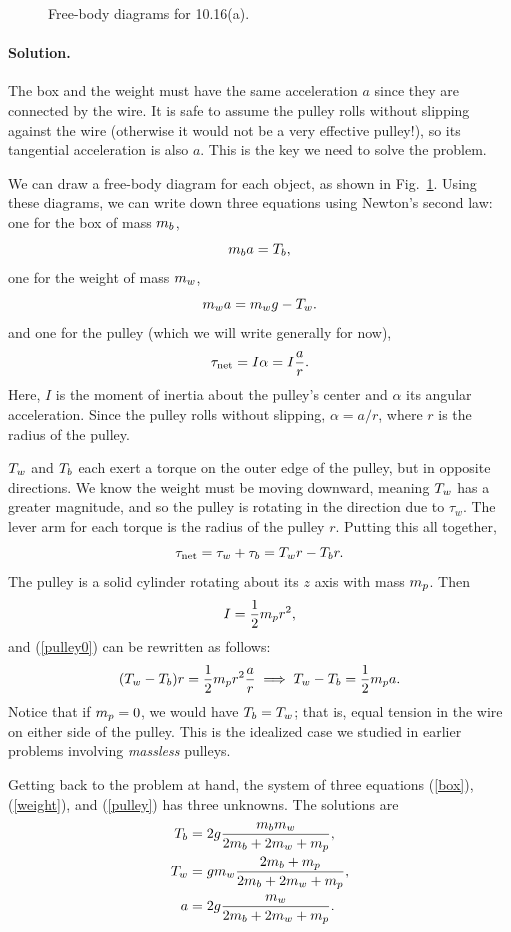 \documentclass[11pt]{article}
\newcommand{\refeq}[1]{(\ref{#1})}
\newcommand{\beq}{\begin{equation*}}
\newcommand{\eeq}{\end{equation*}}
\newcommand{\beqn}{\begin{equation}}
\newcommand{\eeqn}{\end{equation}}
\newenvironment{solution}
{
    \paragraph{Solution.}
    \ignorespaces
}
{
    \bigskip
}
\begin{document}
\begin{figure}[b]
	\vspace{1.5in}
	\caption{Free-body diagrams for 10.16(a).}
	\label{E10.16a}
\end{figure}

\begin{solution}
	The box and the weight must have the same acceleration $a$ since they are connected by the wire.  It is safe to assume the pulley rolls without slipping against the wire (otherwise it would not be a very effective pulley!), so its tangential acceleration is also $a$.  This is the key we need to solve the problem.
	
	We can draw a free-body diagram for each object, as shown in Fig.~\ref{E10.16a}.  Using these diagrams, we can write down three equations using Newton's second law: one for the box of mass $m_b$,
	\beqn \label{box}
		\mb a = \Tb,
	\eeqn
	one for the weight of mass $m_w$,
	\beqn \label{weight}
		\mw a = \mw g - \Tw.
	\eeqn
	and one for the pulley (which we will write generally for now),
	\beqn \label{pulley0}
		\tnet = I \alpha = I \frac{a}{r}.
	\eeqn
	Here, $I$ is the moment of inertia about the pulley's center and $\alpha$ its angular acceleration.  Since the pulley rolls without slipping, $\alpha = a / r$, where $r$ is the radius of the pulley.
			
	$T_w$ and $T_b$ each exert a torque on the outer edge of the pulley, but in opposite directions.  We know the weight must be moving downward, meaning $T_w$ has a greater magnitude, and so the pulley is rotating in the direction due to $\tau_w$.  The lever arm for each torque is the radius of the pulley $r$.  Putting this all together,
	\beq
		\tnet = \tau_w + \tau_b = \Tw r - \Tb r.
	\eeq
	The pulley is a solid cylinder rotating about its $z$ axis with mass $m_p$.  Then
	\beq
		I = \frac{1}{2} \mmp r^2,
	\eeq
	and \refeq{pulley0} can be rewritten as follows:
	\beqn \label{pulley}
		(\Tw - \Tb) r = \frac{1}{2} \mmp r^2 \frac{a}{r} \implies \Tw - \Tb = \frac{1}{2} \mmp a.
	\eeqn
	Notice that if $m_p = 0$, we would have $T_b = T_w$; that is, equal tension in the wire on either side of the pulley.  This is the idealized case we studied in earlier problems involving \emph{massless} pulleys.

	Getting back to the problem at hand, the system of three equations \refeq{box}, \refeq{weight}, and \refeq{pulley} has three unknowns.  The solutions are
	\begin{align}
		T_b &= 2g \frac{m_b m_w}{2 m_b + 2 m_w + m_p}, \label{Tb} \\
		T_w &= g m_w \frac{2 m_b + m_p}{2 m_b + 2 m_w + m_p}, \label{Tw} \\
		a &= 2g \frac{m_w}{2 m_b + 2 m_w + m_p}. \label{acc}
	\end{align}
			

\end{solution}
\end{document}
